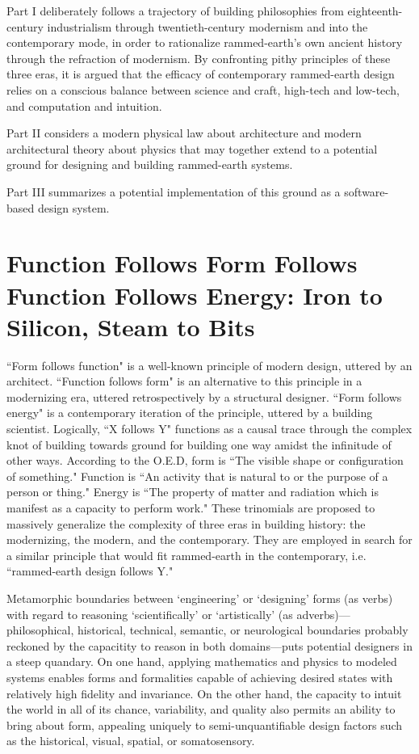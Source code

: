 Part I deliberately follows a trajectory of building philosophies from eighteenth-century industrialism through twentieth-century modernism and into the contemporary mode, in order to rationalize rammed-earth's own ancient history through the refraction of modernism. By confronting pithy principles of these three eras, it is argued that the efficacy of contemporary rammed-earth design relies on a conscious balance between science and craft, high-tech and low-tech, and computation and intuition.

Part II considers a modern physical law about architecture and modern architectural theory about physics that may together extend to a potential ground for designing and building rammed-earth systems.

Part III summarizes a potential implementation of this ground as a software-based design system.

\clearpage

\section{Function Follows Form Follows Function Follows Energy: Iron to Silicon, Steam to Bits}

``Form follows function" is a well-known principle of modern design, uttered by an architect. ``Function follows form" is an alternative to this principle in a modernizing era, uttered retrospectively by a structural designer. ``Form follows energy" is a contemporary iteration of the principle, uttered by a building scientist. Logically, ``X follows Y" functions as a causal trace through the complex knot of building towards ground for building one way amidst the infinitude of other ways. According to the O.E.D, form is ``The visible shape or configuration of something." Function is ``An activity that is natural to or the purpose of a person or thing." Energy is ``The property of matter and radiation which is manifest as a capacity to perform work." These trinomials are proposed to massively generalize the complexity of three eras in building history: the modernizing, the modern, and the contemporary. They are employed in search for a similar principle that would fit rammed-earth in the contemporary, i.e. ``rammed-earth design follows Y."

Metamorphic boundaries between `engineering' or `designing' forms (as verbs) with regard to reasoning `scientifically' or `artistically' (as adverbs)---philosophical, historical, technical, semantic, or neurological boundaries probably reckoned by the capacitity to reason in both domains---puts potential designers in a steep quandary. On one hand, applying mathematics and physics to modeled systems enables forms and formalities capable of achieving desired states with relatively high fidelity and invariance. On the other hand, the capacity to intuit the world in all of its chance, variability, and quality also permits an ability to bring about form, appealing uniquely to semi-unquantifiable design factors such as the historical, visual, spatial, or somatosensory.

